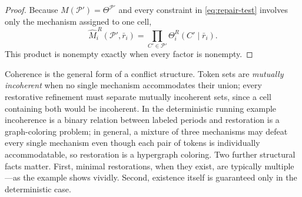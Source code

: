 \documentclass[11pt]{article}
\theoremstyle{definition}
\begin{document}
\begin{proof}
Because $M(\mathcal P')=\Theta^{\mathcal P'}$ and every constraint in \cref{eq:repair-test} involves only the mechanism assigned to one cell,
\[
\widehat M_i^{\,R}(\mathcal P',\bar r_i)
=
\prod_{C'\in\mathcal P'}
\Theta_i^{R}(C'\mid\bar r_i).
\]
This product is nonempty exactly when every factor is nonempty.
\end{proof}

Coherence is the general form of a conflict structure.
Token sets are \emph{mutually incoherent} when no single mechanism accommodates their union; every restorative refinement must separate mutually incoherent sets, since a cell containing both would be incoherent.
In the deterministic running example incoherence is a binary relation between labeled periods and restoration is a graph-coloring problem; in general, a mixture of three mechanisms may defeat every single mechanism even though each pair of tokens is individually accommodatable, so restoration is a hypergraph coloring.
Two further structural facts matter.
First, minimal restorations, when they exist, are typically multiple---as the example shows vividly.
Second, existence itself is guaranteed only in the deterministic case.
\end{document}
